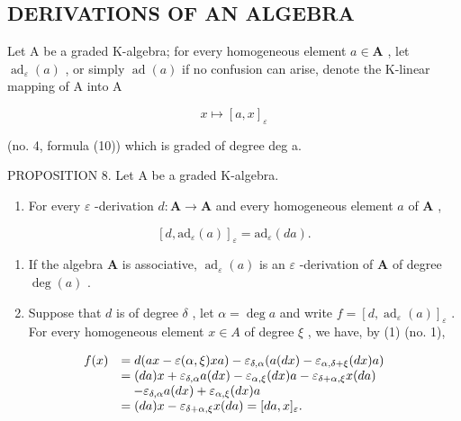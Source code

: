 \subsection{DERIVATIONS OF AN ALGEBRA}

Let A be a graded K-algebra; for every homogeneous element \(a \in \mathbf{A}\) , let \(\operatorname{ad}_{\varepsilon}(a)\) , or simply \(\operatorname{ad}(a)\) if no confusion can arise, denote the K-linear mapping of A into A

\[
x \mapsto [ a, x ] _ {\varepsilon}
\]

(no. 4, formula (10)) which is graded of degree deg a.

PROPOSITION 8. Let A be a graded K-algebra.

\begin{enumerate}
\def\labelenumi{(\roman{enumi})}
\tightlist
\item
  For every \(\varepsilon\) -derivation \(d: \mathbf{A} \to \mathbf{A}\) and every homogeneous element \(a\) of \(\mathbf{A}\) ,
\end{enumerate}

\[
[ d, \mathrm{ad} _ {\varepsilon} (a) ] _ {\varepsilon} = \mathrm{ad} _ {\varepsilon} (d a).\tag{24}
\]

\begin{enumerate}
\def\labelenumi{(\roman{enumi})}
\setcounter{enumi}{1}
\item
  If the algebra \(\mathbf{A}\) is associative, \(\operatorname{ad}_{\varepsilon}(a)\) is an \(\varepsilon\) -derivation of \(\mathbf{A}\) of degree \(\deg(a)\) .
\item
  Suppose that \(d\) is of degree \(\delta\) , let \(\alpha = \deg a\) and write \(f = [d, \operatorname{ad}_{\varepsilon}(a)]_{\varepsilon}\) . For every homogeneous element \(x \in A\) of degree \(\xi\) , we have, by (1) (no. 1),
\end{enumerate}

\[
\begin{array}{r l} f (x) & = d (a x - \varepsilon (\alpha , \xi) x a) - \varepsilon_ {\delta , \alpha} (a (d x) - \varepsilon_ {\alpha , \delta + \xi} (d x) a) \\ & = (d a) x + \varepsilon_ {\delta , \alpha} a (d x) - \varepsilon_ {\alpha , \xi} (d x) a - \varepsilon_ {\delta + \alpha , \xi} x (d a) \\ & \quad - \varepsilon_ {\delta , \alpha} a (d x) + \varepsilon_ {\alpha , \xi} (d x) a \\ & = (d a) x - \varepsilon_ {\delta + \alpha , \xi} x (d a) = [ d a, x ] _ {\varepsilon}. \end{array}
\]

